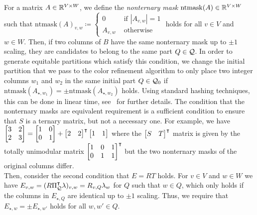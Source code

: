 \documentclass[pdflatex,sn-mathphys-num]{sn-jnl}%
\theoremstyle{thmstyleone}%
\theoremstyle{thmstylethree}%
\theoremstyle{thmstyletwo}%
\begin{document}
For a matrix $A \in \mathbb{R}^{V\times W}$, we define the \emph{nonternary mask} $\mathrm{ntmask}(A) \in \mathbb{R}^{V\times W}$ such that $\mathrm{ntmask}(A)_{v,w} \coloneqq \begin{cases}
    0 &\text{ if $|A_{v,w}| = 1$}\\
    A_{v,w} &\text{ otherwise }
\end{cases}$ holds for all $v\in V$ and $w\in W$. Then, if two columns of $B$ have the same nonternary mask up to $\pm 1$ scaling, they are candidates to belong to the same part $Q\in \mathcal{Q}$. 
In order to generate equitable partitions which satisfy this condition, we change the initial partition that we pass to the color refinement algorithm to only place two integer columns $w_1$ and $w_2$ in the same initial part $Q\in \mathcal{Q}_0$ if $\mathrm{ntmask}(A_{\star,w_1}) = \pm \mathrm{ntmask}(A_{\star,w_2})$ holds. Using standard hashing techniques, this can be done in linear time, see~\cite{Gemander2020} for further details. The condition that the nonternary masks are equivalent requirement is a sufficient condition to ensure that $S$ is a ternary matrix, but not a necessary one. For example, we have $\begin{bmatrix}
    3 & 2\\
    2 & 3 
\end{bmatrix} = \begin{bmatrix}
    1 & 0 \\
    0 & 1 
\end{bmatrix} + \begin{bmatrix}
    2 & 2
\end{bmatrix}^{\intercal} \begin{bmatrix}
    1 & 1 
\end{bmatrix}$ where the $\begin{bmatrix}
    S & T
\end{bmatrix}^{\intercal}$ matrix is given by the totally unimodular matrix  $\begin{bmatrix}
    1 & 0 & 1 \\
    0 & 1 & 1 
\end{bmatrix}^{\intercal}$ but the two nonternary masks of the original columns differ. \\

Then, consider the second condition that $E=R T$ holds. For $v\in V$ and $w\in W$ we have $E_{v,w} = (R \Pi_{\mathcal{Q}}^{\intercal} \lambda)_{v,w} = R_{v,Q} \lambda_w$ for $Q$ such that $w\in Q$, which only holds if the columns in $E_{\star,Q}$ are identical up to $\pm 1$ scaling. Thus, we require that $E_{\star,w} = \pm E_{\star,w'}$ holds for all $w,w'\in Q$.\\
\end{document}
